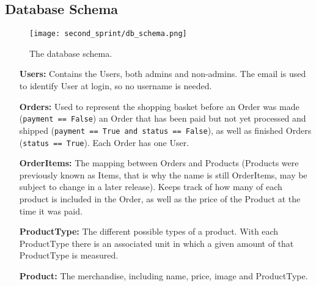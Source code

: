 \newpage

\subsection{Database Schema}

\begin{figure}[H]
  \centering
  \texttt{[image: second\_sprint/db\_schema.png]}
  \caption{\label{fig:schema} The database schema.}
\end{figure}

\begin{itemize}
  \item[\textbf{Users:}] Contains the Users, both admins and non-admins. The
    email is used to identify User at login, so no username is needed.
  \item[\textbf{Orders:}] Used to represent the shopping basket before an
    Order was made (\texttt{payment == False}) an Order that has
    been paid but not yet processed and shipped (\texttt{payment == True and status == False}), as well as finished Orders
    (\texttt{status == True}). Each Order has one User.
  \item[\textbf{OrderItems:}] The mapping between Orders and Products
    (Products were previously known as Items, that is why the name is still
    OrderItems, may be subject to change in a later release). Keeps track
    of how many of each product is included in the Order, as well as the
    price of the Product at the time it was paid.
  \item[\textbf{ProductType:}] The different possible types of a product. With
    each ProductType there is an associated unit in which a given amount
    of that ProductType is measured.
  \item[\textbf{Product:}] The merchandise, including name, price, image and
    ProductType.
\end{itemize}
